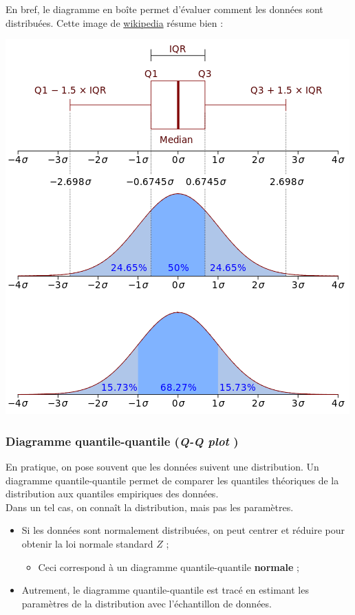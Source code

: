 \documentclass[10pt, french]{article}
\begin{document}
\begin{multicols*}{2}
\columnbreak
En bref, le diagramme en boîte permet d'évaluer comment les données sont distribuées. Cette image de \href{https://en.wikipedia.org/wiki/Interquartile_range}{wikipedia} résume bien : 
\begin{center}
	\includegraphics[scale=0.4]{../../src/ACT-2000/boxplot-normrule.png}
\end{center}


\columnbreak
\subsubsection{Diagramme quantile-quantile (\og \textit{Q-Q plot} \fg{})}
En pratique, on pose souvent que les données suivent une distribution. Un diagramme quantile-quantile permet de comparer les quantiles théoriques de la distribution aux quantiles empiriques des données. \\

Dans un tel cas, on connaît la distribution, mais pas les paramètres.
\begin{itemize}
	\item	Si les données sont normalement distribuées, on peut centrer et réduire pour obtenir la loi normale standard $Z$ ; 
		\begin{itemize}
		\item	Ceci correspond à un diagramme quantile-quantile \textbf{normale} ;
		\end{itemize}
	\item	Autrement, le diagramme quantile-quantile est tracé en estimant les paramètres de la distribution avec l'échantillon de données.
\end{itemize}


\end{multicols*}
\end{document}
